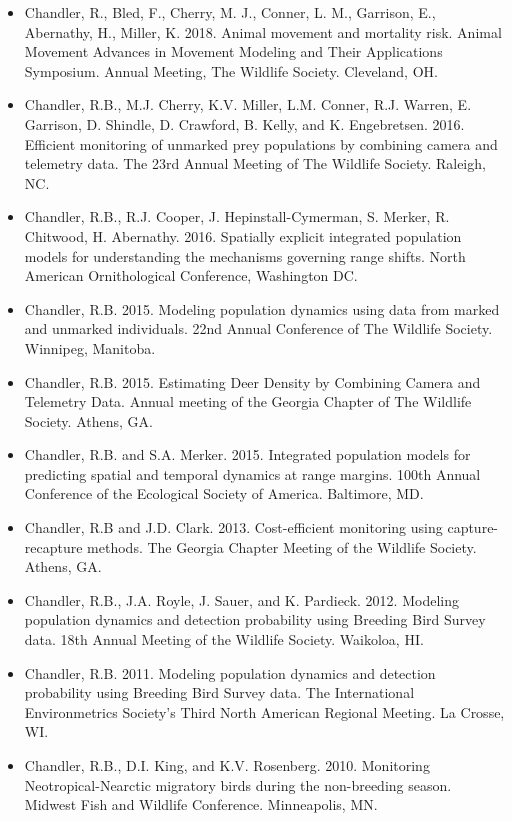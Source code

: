 \documentclass[12pt]{article}
\begin{document}
\begin{itemize}

\item Chandler, R., Bled, F., Cherry, M. J., Conner, L. M., Garrison,
  E., Abernathy, H., Miller, K. 2018. Animal movement and mortality
  risk. Animal Movement Advances in Movement Modeling and Their
  Applications Symposium. Annual Meeting, The Wildlife
  Society. Cleveland, OH. 
  
\item Chandler, R.B., M.J. Cherry, K.V. Miller, L.M. Conner,
  R.J. Warren, E. Garrison, D. Shindle, D. Crawford, B. Kelly, and K. 
  Engebretsen. 2016. Efficient monitoring of unmarked prey populations
  by combining camera and telemetry data. The 23rd Annual Meeting of
  The Wildlife Society. Raleigh, NC.

\item Chandler, R.B., R.J. Cooper, J. Hepinstall-Cymerman, S. Merker, R.
  Chitwood, H. Abernathy. 2016. Spatially explicit integrated
  population models for understanding the mechanisms governing range
  shifts. North American Ornithological Conference, Washington DC. 

\item Chandler, R.B. 2015. Modeling population dynamics using data
  from marked and unmarked individuals. 22nd Annual Conference of The
  Wildlife Society. Winnipeg, Manitoba.

\item Chandler, R.B. 2015. Estimating Deer Density by Combining Camera
  and Telemetry Data. Annual meeting of the Georgia Chapter of The
  Wildlife Society. Athens, GA.

\item Chandler, R.B. and S.A. Merker. 2015. Integrated population
  models for predicting spatial and temporal dynamics at range
  margins. 100th Annual Conference of the Ecological Society of
  America. Baltimore, MD. 

\item Chandler, R.B and J.D. Clark. 2013. Cost-efficient monitoring
  using capture-recapture methods. The Georgia Chapter Meeting of the
  Wildlife Society. Athens, GA.

\item Chandler, R.B., J.A. Royle, J. Sauer, and
  K. Pardieck. 2012. Modeling population dynamics and detection
  probability using Breeding Bird Survey data. 18th Annual Meeting of
  the Wildlife Society. Waikoloa, HI.

\item Chandler, R.B. 2011. Modeling population dynamics and detection
  probability using Breeding Bird Survey data. The International
  Environmetrics Society's Third North
  American Regional Meeting. La Crosse, WI.

\item Chandler, R.B., D.I. King, and K.V. Rosenberg. 2010. Monitoring
  Neotropical-Nearctic migratory birds during the non-breeding
  season. Midwest Fish and Wildlife Conference. Minneapolis, MN.

\end{itemize}
\end{document}
